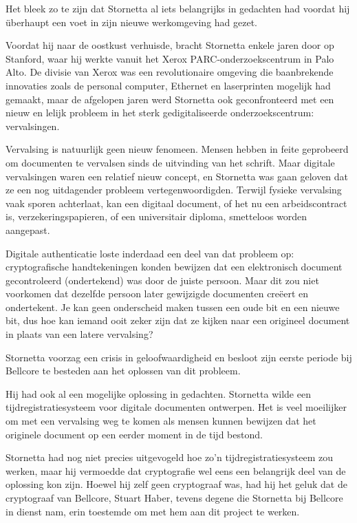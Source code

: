 \documentclass[smalldemyvopaper,11pt,twoside,onecolumn,openright,extrafontsizes,hidelinks]{memoir}
\begin{document}
Het bleek zo te zijn dat Stornetta al iets belangrijks in gedachten had
voordat hij überhaupt een voet in zijn nieuwe werkomgeving had gezet.

Voordat hij naar de oostkust verhuisde, bracht Stornetta enkele jaren
door op Stanford, waar hij werkte vanuit het Xerox
PARC-onderzoekscentrum in Palo Alto. De divisie van Xerox was een
revolutionaire omgeving die baanbrekende innovaties zoals de personal
computer, Ethernet en laserprinten mogelijk had gemaakt, maar de
afgelopen jaren werd Stornetta ook geconfronteerd met een nieuw en
lelijk probleem in het sterk gedigitaliseerde onderzoekscentrum:
vervalsingen.

Vervalsing is natuurlijk geen nieuw fenomeen. Mensen hebben in feite
geprobeerd om documenten te vervalsen sinds de uitvinding van het
schrift. Maar digitale vervalsingen waren een relatief nieuw concept, en
Stornetta was gaan geloven dat ze een nog uitdagender probleem
vertegenwoordigden. Terwijl fysieke vervalsing vaak sporen achterlaat,
kan een digitaal document, of het nu een arbeidscontract is,
verzekeringspapieren, of een universitair diploma, smetteloos worden
aangepast.

Digitale authenticatie loste inderdaad een deel van dat probleem op:
cryptografische handtekeningen konden bewijzen dat een elektronisch
document gecontroleerd (ondertekend) was door de juiste persoon. Maar
dit zou niet voorkomen dat dezelfde persoon later gewijzigde documenten
creëert en ondertekent. Je kan geen onderscheid maken tussen een oude
bit en een nieuwe bit, dus hoe kan iemand ooit zeker zijn dat ze kijken
naar een origineel document in plaats van een latere vervalsing?

Stornetta voorzag een crisis in geloofwaardigheid en besloot zijn eerste
periode bij Bellcore te besteden aan het oplossen van dit probleem.

Hij had ook al een mogelijke oplossing in gedachten. Stornetta wilde een
tijdregistratiesysteem voor digitale documenten ontwerpen. Het is veel
moeilijker om met een vervalsing weg te komen als mensen kunnen bewijzen
dat het originele document op een eerder moment in de tijd bestond.

Stornetta had nog niet precies uitgevogeld hoe zo'n
tijdregistratiesysteem zou werken, maar hij vermoedde dat cryptografie
wel eens een belangrijk deel van de oplossing kon zijn. Hoewel hij zelf
geen cryptograaf was, had hij het geluk dat de cryptograaf van Bellcore,
Stuart Haber, tevens degene die Stornetta bij Bellcore in dienst nam,
erin toestemde om met hem aan dit project te werken.
\end{document}
